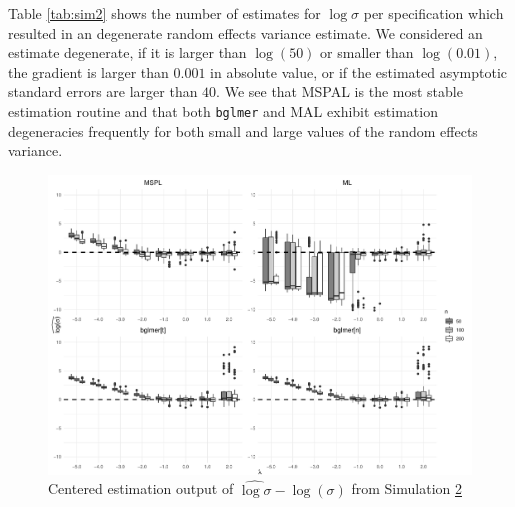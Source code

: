 \documentclass[11pt, a4paper]{article}
\theoremstyle{example} \newtheorem{example}{Example}[section]
\theoremstyle{theorem} \newtheorem{theorem}{Theorem}[section]
\theoremstyle{theorem }\newtheorem{proposition}{Proposition}[section]
\theoremstyle{theorem }\newtheorem{corollary}{Corollary}[section]
\begin{document}
Table \ref{tab:sim2} shows the number of estimates for $\log \sigma$ per specification which resulted in an degenerate random effects variance estimate. We considered an estimate degenerate, if it is larger than $\log(50)$ or smaller than $\log(0.01)$, the gradient is larger than $0.001$ in absolute value, or if the estimated asymptotic standard errors are larger than $40$. We see that MSPAL is the most stable estimation routine and that both \texttt{bglmer} and MAL exhibit estimation degeneracies frequently for both small and large values of the random effects variance. 
\begin{figure}[H]
	\begin{center}
		\includegraphics[width=\textwidth]{Figures/sim2.pdf}
	\end{center}
	\caption{Centered estimation output of $\widehat{\log \sigma }-\log(\sigma)$ from Simulation \hyperref[sec:sim2]{2}}
	\label{fig:sim2}
\end{figure}
\end{document}
